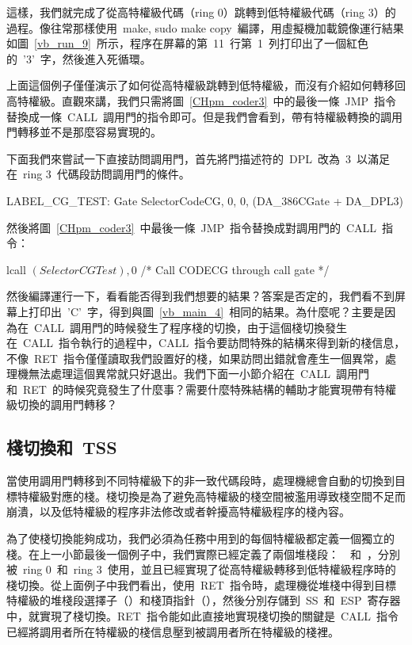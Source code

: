 這樣，我們就完成了從高特權級代碼（ring 0）跳轉到低特權級代碼（ring 3）的過程。像往常那樣使用~make, sudo make copy~編譯，用虛擬機加載鏡像運行結果如圖~\ref{vb_run_9}~所示，程序在屏幕的第~11~行第~1~列打印出了一個紅色的~'3'~字，然後進入死循環。


上面這個例子僅僅演示了如何從高特權級跳轉到低特權級，而沒有介紹如何轉移回高特權級。直觀來講，我們只需將圖~\ref{CHpm_coder3}~中的最後一條~JMP~指令替換成一條~CALL~調用門的指令即可。但是我們會看到，帶有特權級轉換的調用門轉移並不是那麼容易實現的。

下面我們來嘗試一下直接訪問調用門，首先將門描述符的~DPL~改為~3~以滿足在~ring 3~代碼段訪問調用門的條件。

\begin{Command}
LABEL_CG_TEST:      Gate    SelectorCodeCG, 0, 0, (DA_386CGate + DA_DPL3)
\end{Command}

然後將圖~\ref{CHpm_coder3}~中最後一條~JMP~指令替換成對調用門的~CALL~指令：

\begin{Command}
lcall   $(SelectorCGTest), $0  /* Call CODECG through call gate */
\end{Command}

然後編譯運行一下，看看能否得到我們想要的結果？答案是否定的，我們看不到屏幕上打印出~'C'~字，得到與圖~\ref{vb_main_4}~相同的結果。為什麼呢？主要是因為在~CALL~調用門的時候發生了程序棧的切換，由于這個棧切換發生在~CALL~指令執行的過程中，CALL~指令要訪問特殊的結構來得到新的棧信息，不像~RET~指令僅僅讀取我們設置好的棧，如果訪問出錯就會產生一個異常，處理機無法處理這個異常就只好退出。我們下面一小節介紹在~CALL~調用門和~RET~的時候究竟發生了什麼事？需要什麼特殊結構的輔助才能實現帶有特權級切換的調用門轉移？

\subsection{棧切換和~TSS}

當使用調用門轉移到不同特權級下的非一致代碼段時，處理機總會自動的切換到目標特權級對應的棧。棧切換是為了避免高特權級的棧空間被濫用導致棧空間不足而崩潰，以及低特權級的程序非法修改或者幹擾高特權級程序的棧內容。

為了使棧切換能夠成功，我們必須為任務中用到的每個特權級都定義一個獨立的棧。在上一小節最後一個例子中，我們實際已經定義了兩個堆棧段：~~和~，分別被~ring 0~和~ring 3~使用，並且已經實現了從高特權級轉移到低特權級程序時的棧切換。從上面例子中我們看出，使用~RET~指令時，處理機從堆棧中得到目標特權級的堆棧段選擇子（）和棧頂指針（），然後分別存儲到~SS~和~ESP~寄存器中，就實現了棧切換。RET~指令能如此直接地實現棧切換的關鍵是~CALL~指令已經將調用者所在特權級的棧信息壓到被調用者所在特權級的棧裡。

